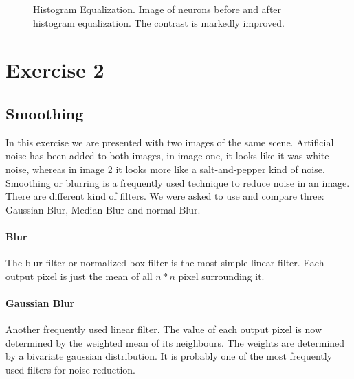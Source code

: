 \documentclass[11pt,a4paper]{article}
\begin{document}
\begin{figure}
\quad
{}
\caption{Histogram Equalization. Image of neurons before and after histogram equalization. The contrast is markedly improved.}%
\label{fig:eq}%
\end{figure}

\section{Exercise 2}
\subsection{Smoothing}

In this exercise we are presented with two images of the same scene. Artificial noise has been added to both images, in image one, it looks like it was white noise, whereas in image 2 it looks more like a salt-and-pepper kind of noise. Smoothing or blurring is a frequently used technique to reduce noise in an image. There are different kind of filters. We were asked to use and compare three: Gaussian Blur, Median Blur and normal Blur.
\paragraph{Blur}
The blur filter or normalized box filter is the most simple linear filter. Each output pixel is just the mean of all $n*n$ pixel surrounding it.
\paragraph{Gaussian Blur}
Another frequently used linear filter. The value of each output pixel is now determined by the weighted mean of its neighbours. The weights are determined by a bivariate gaussian distribution. It is probably one of the most frequently used filters for noise reduction.	
\end{document}

